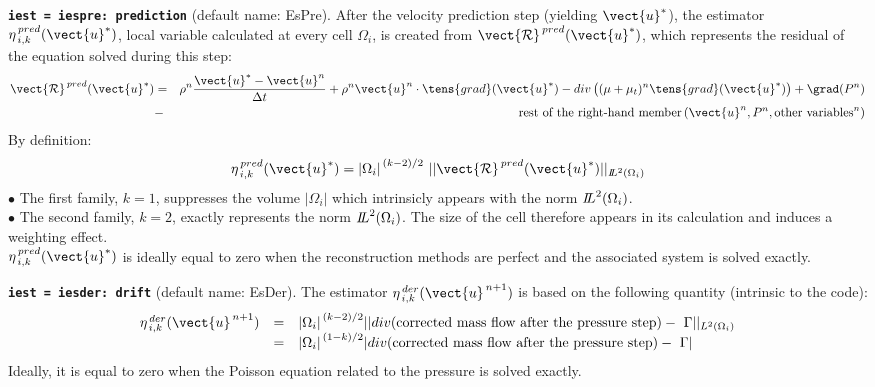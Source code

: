 {\tt \bf iest = iespre: prediction} (default name: EsPre).
After the velocity prediction step (yielding $\vect{u}^*$), the
estimator $\eta^{\,pred}_{\,i,k}(\vect{u}^*)$, local variable calculated
at every cell $\Omega_i$, is created from $\vect{\mathcal
R}^{\,pred}(\vect{u}^*)$, which represents the residual of the equation
solved during this step:
\begin{eqnarray*}
\vect{\mathcal R}^{\,pred}(\vect{u}^*)&= & \rho^n \frac{\vect{u}^*-\vect{u}^n}{\Delta t}
              + \rho^n \vect{u}^n \cdot \tens{grad}(\vect{u}^*)
              - div \left((\mu+\mu_t)^n \tens{grad}(\vect{u}^*) \right)
              + \grad(P^n)     \\
              &- &\text{rest of the right-hand member}
                        \,(\vect{u}^n, P^n, \text{other variables}^n)
\end{eqnarray*}
By definition:
$$ \eta^{\,pred}_{\,i,k}(\vect{u}^*)= {|\Omega_i|}^{\,(k-2)/2}\ ||\vect{\mathcal R}^{\,pred}(\vect{u}^*)||
_{{I\hspace{-.25em}L}^{2}(\Omega_i)}$$
\hspace*{0.5cm}$\bullet$ The first family, $k=1$, suppresses the
volume $|\Omega_i|$ which intrinsicly appears  with the norm
${{I\hspace{-.25em}L}^{2}(\Omega_i)}$.\\
\hspace*{0.5cm}$\bullet$ The second family, $k=2$, exactly represents the norm
${{I\hspace{-.25em}L}^{2}(\Omega_i)}$. The size of the cell therefore
appears in its calculation and induces a weighting effect.\\
$ \eta^{\,pred}_{\,i,k}(\vect{u}^*)$  is ideally equal to zero when the
reconstruction methods are perfect and the associated system is
solved exactly.

{\tt \bf iest = iesder: drift}  (default name: EsDer).
The estimator $\eta^{\,der}_{\,i,k}(\vect{u}^{\,n+1})$ is based on the
following quantity (intrinsic to the code):
\begin{equation}
\begin{array}{lll}
 \eta^{\,der}_{\,i,k}(\vect{u}^{\,n+1})
&=& {|\Omega_i|}^{\,(k-2)/2}
||div (\text{corrected mass flow after the pressure step})
                                              -\ \Gamma||_{{L}^{2}(\Omega_i)} \\
&=& {|\Omega_i|}^{\,(1-k)/2}
|div (\text{corrected mass flow after the pressure step})-\ \Gamma|
\end{array}
\end{equation}
Ideally, it is equal to zero when the Poisson equation related to the pressure is
solved exactly.

